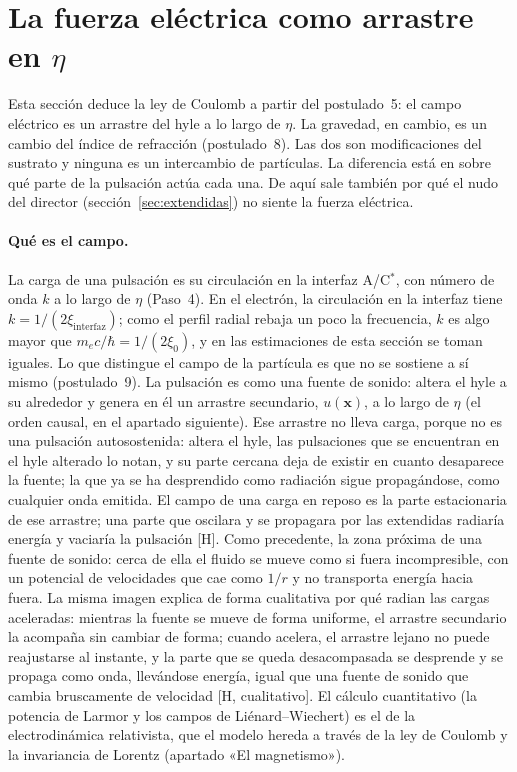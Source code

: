 \documentclass[11pt,a4paper]{article}
\newcommand{\st}[1]{\textup{[#1]}}
\newcommand{\Cst}{C\ensuremath{^{*}}}
\newcommand{\vb}[1]{\symbf{#1}}
\newcommand{\apartado}[1]{\paragraph{#1}}
\begin{document}
\section{La fuerza eléctrica como arrastre en \texorpdfstring{$\eta$}{η}}\label{sec:arrastre}

Esta sección deduce la ley de Coulomb a partir del postulado~5: el campo eléctrico es un arrastre del hyle a lo largo de $\eta$. La gravedad, en cambio, es un cambio del índice de refracción (postulado~8). Las dos son modificaciones del sustrato y ninguna es un intercambio de partículas. La diferencia está en sobre qué parte de la pulsación actúa cada una. De aquí sale también por qué el nudo del director (sección~\ref{sec:extendidas}) no siente la fuerza eléctrica.

\apartado{Qué es el campo.} La carga de una pulsación es su circulación en la interfaz A/\Cst, con número de onda $k$ a lo largo de $\eta$ (Paso~4). En el electrón, la circulación en la interfaz tiene $k=1/(2\xi_{\mathrm{interfaz}})$; como el perfil radial rebaja un poco la frecuencia, $k$ es algo mayor que $m_ec/\hbar=1/(2\xi_0)$, y en las estimaciones de esta sección se toman iguales. Lo que distingue el campo de la partícula es que no se sostiene a sí mismo (postulado~9). La pulsación es como una fuente de sonido: altera el hyle a su alrededor y genera en él un arrastre secundario, $u(\vb{x})$, a lo largo de $\eta$ (el orden causal, en el apartado siguiente). Ese arrastre no lleva carga, porque no es una pulsación autosostenida: altera el hyle, las pulsaciones que se encuentran en el hyle alterado lo notan, y su parte cercana deja de existir en cuanto desaparece la fuente; la que ya se ha desprendido como radiación sigue propagándose, como cualquier onda emitida. El campo de una carga en reposo es la parte estacionaria de ese arrastre; una parte que oscilara y se propagara por las extendidas radiaría energía y vaciaría la pulsación \st{H}. Como precedente, la zona próxima de una fuente de sonido: cerca de ella el fluido se mueve como si fuera incompresible, con un potencial de velocidades que cae como $1/r$ y no transporta energía hacia fuera. La misma imagen explica de forma cualitativa por qué radian las cargas aceleradas: mientras la fuente se mueve de forma uniforme, el arrastre secundario la acompaña sin cambiar de forma; cuando acelera, el arrastre lejano no puede reajustarse al instante, y la parte que se queda desacompasada se desprende y se propaga como onda, llevándose energía, igual que una fuente de sonido que cambia bruscamente de velocidad \st{H, cualitativo}. El cálculo cuantitativo (la potencia de Larmor y los campos de Liénard--Wiechert) es el de la electrodinámica relativista, que el modelo hereda a través de la ley de Coulomb y la invariancia de Lorentz (apartado «El magnetismo»).
\end{document}

